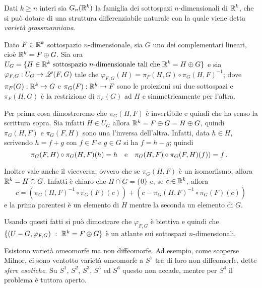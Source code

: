 \begin{example} 
	Dati $k \geq n$ interi sia $G_n(\mathbb R^k)$ la famiglia dei sottospazi $n$-dimensionali di $\mathbb R^k$, che si può dotare di una struttura differenziabile naturale con la quale viene detta \emph{varietà grassmanniana}. 
 
 Dato $F \in \mathbb R^k$ sottospazio $n$-dimensionale, sia $G$ uno dei complementari lineari, cioè $\mathbb R^k=F \oplus G$.
 Sia ora $U_G=\{H\in \mathbb R^k \text{ sottospazio $n$-dimensionale tali che }\mathbb R^k=H \oplus G\}$ e sia
 $\varphi_{F,G}:U_G \to \mathscr L(F,G)$ tale che $\varphi_{F,G}(H)=\pi_F(H,G) \circ \pi_G(H,F)^{-1}$; dove
 $\pi_F(G):\mathbb R^k \to G$ e $\pi_G(F):\mathbb R^k \to F$ sono le proiezioni sui due sottospazi e $\pi_F(H,G)$ è la restrizione di $\pi_F(G)$ ad $H$
 e simmetricamente per l'altra. 
 
 Per prima cosa dimostreremo che $\pi_G(H,F)$ è invertibile e quindi che ha senso la scrittura sopra.
 Sia infatti $H \in U_G$ allora $\mathbb R^k=F \oplus G=H \oplus G$, quindi $\pi_G(H,F)$ e $\pi_G(F,H)$ sono una l'inversa dell'altra. Infatti, data $h\in H$, scrivendo
 $h=f+g$ con $f \in F$ e $g \in G$ si ha $f=h-g$; quindi
 \begin{equation*}
 \pi_G(F,H) \circ \pi_G(H,F)(h)=h \quad \text{e} \quad \pi_G(H,F) \circ \pi_G(F,H)(f))=f \, \text{. }
 \end{equation*}
 
 Inoltre vale anche il viceversa, ovvero che se $\pi_G(H,F)$ è un isomorfismo, allora $\mathbb R^k=H \oplus G$. Infatti
 è chiaro che $H \cap G=\{0\}$ e, se $c \in \mathbb R^k$, allora
 \begin{equation*}
 c=(\pi_G(H,F)^{-1} \circ \pi_G(F)(c))+(c-\pi_G(H,F)^{-1} \circ \pi_G(F)(c))
 \end{equation*}
 e la prima parentesi
 è un elemento di $H$ mentre la seconda un elemento di $G$.
 
 Usando questi fatti si può dimostrare che $\varphi_{F,G}$ è biettiva e quindi che $\{(U-G,\varphi_{F,G}) \ :\  \mathbb R^k=F \oplus G \}$ è 
 un atlante sui sottospazi $n$-dimensionali.
 
 \end{example}

 
 \begin{remark} 
  Esistono varietà omeomorfe ma non diffeomorfe. Ad esempio, come scoperse Milnor, ci sono ventotto varietà
  omeomorfe a $S^7$ tra di loro non diffeomorfe, dette \emph{sfere esotiche}. Su $S^1$, $S^2$, $S^3$, $S^5$
  ed $S^6$ questo non accade, mentre per $S^4$ il problema è tuttora aperto.
 \end{remark}
 
